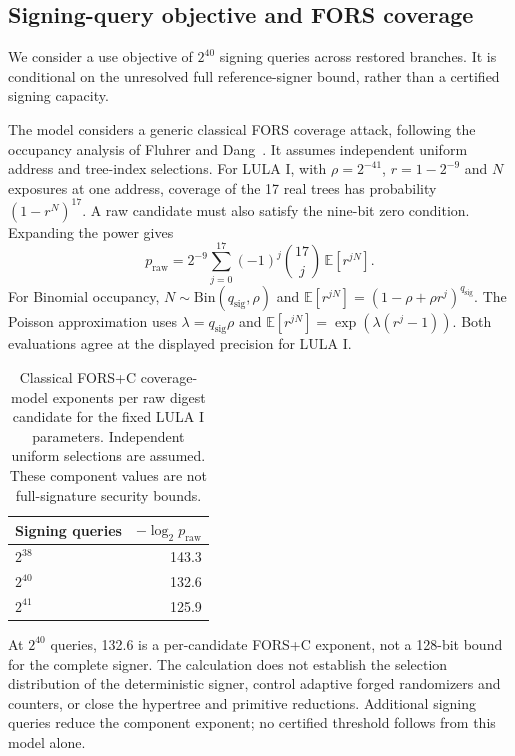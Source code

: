 \subsection{Signing-query objective and FORS coverage}\label{sec:operating}
We consider a use objective of $2^{40}$ signing queries across restored branches. It is conditional on the unresolved full reference-signer bound, rather than a certified signing capacity.

The model considers a generic classical FORS coverage attack, following the occupancy analysis of Fluhrer and Dang~\cite[Section~5, Equation~(1)]{fluhrer}. It assumes independent uniform address and tree-index selections. For LULA I, with $\rho=2^{-41}$, $r=1-2^{-9}$ and $N$ exposures at one address, coverage of the 17 real trees has probability $(1-r^N)^{17}$. A raw candidate must also satisfy the nine-bit zero condition. Expanding the power gives
\[
 p_{\mathrm{raw}}=2^{-9}\sum_{j=0}^{17}(-1)^j\binom{17}{j}\,\mathbb E[r^{jN}].
\]
For Binomial occupancy, $N\sim\mathrm{Bin}(q_{\mathrm{sig}},\rho)$ and $\mathbb E[r^{jN}]=(1-\rho+\rho r^j)^{q_{\mathrm{sig}}}$. The Poisson approximation uses $\lambda=q_{\mathrm{sig}}\rho$ and $\mathbb E[r^{jN}]=\exp(\lambda(r^j-1))$. Both evaluations agree at the displayed precision for LULA I.

\begin{table}[t]
\caption{Classical FORS+C coverage-model exponents per raw digest candidate for the fixed LULA I parameters. Independent uniform selections are assumed. These component values are not full-signature security bounds.}\label{tab:security-model}
\centering\small
\begin{tabular}{lr}\toprule
Signing queries & $-\log_2 p_{\mathrm{raw}}$\\\midrule
$2^{38}$ &143.3\\
$2^{40}$ &132.6\\
$2^{41}$ &125.9\\\bottomrule
\end{tabular}
\end{table}

At $2^{40}$ queries, 132.6 is a per-candidate FORS+C exponent, not a 128-bit bound for the complete signer. The calculation does not establish the selection distribution of the deterministic signer, control adaptive forged randomizers and counters, or close the hypertree and primitive reductions. Additional signing queries reduce the component exponent; no certified threshold follows from this model alone.
